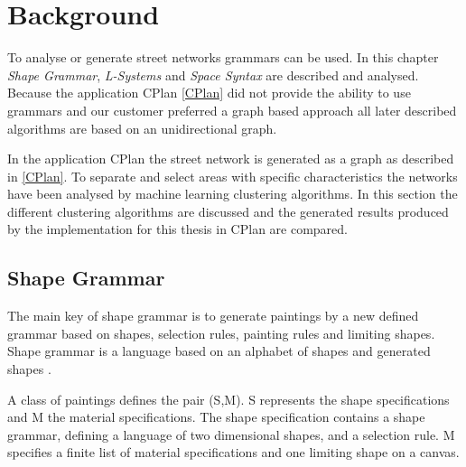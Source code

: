\chapter{Background}
To analyse or generate street networks grammars can be used. In this chapter \textit{Shape Grammar}, \textit{L-Systems} and \textit{Space Syntax} are described and analysed. Because the application CPlan \ref{CPlan} did not provide the ability to use grammars and our customer preferred a graph based approach all later described algorithms are based on an unidirectional graph.

In the application CPlan the street network is generated as a graph as described in \ref{CPlan}. To separate and select areas with specific characteristics the networks have been analysed by machine learning clustering algorithms. In this section the different clustering algorithms are discussed and the generated results produced by the implementation for this thesis in CPlan are compared.

\section{Shape Grammar} \label{sec:shape_grammar}
The main key of shape grammar is to generate paintings by a new defined grammar based on shapes, selection rules, painting rules and limiting shapes. Shape grammar is a language based on an alphabet of shapes and generated shapes \citep{shapeGrammars:1972}.

A class of paintings defines the pair (S,M). S represents the shape specifications and M the material specifications. The shape specification contains a shape grammar, defining a language of two dimensional shapes, and a selection rule. M specifies a finite list of material specifications and one limiting shape on a canvas.

